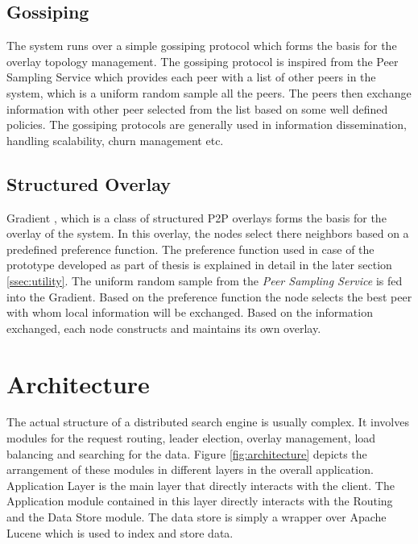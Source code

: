\documentclass[12pt,a4paper,twoside,openright]{book}
\begin{document}
\subsection{Gossiping}
The system runs over a simple gossiping protocol which forms the basis for the overlay topology management. The gossiping protocol is inspired from the Peer Sampling Service \cite{samplingService} which provides each peer with a list of other peers in the system,  which is a uniform random sample all the peers. The peers then exchange information with other peer selected from the list based on some well defined policies. The gossiping protocols are generally used in information dissemination, handling scalability, churn management etc.


\subsection{Structured Overlay}

Gradient \cite{sacha2006discovery}, which is a class of structured P2P overlays forms the basis for the overlay of the system. In this overlay, the nodes select there neighbors based on a predefined preference function. The preference function used in case of the prototype developed as part of thesis is explained in detail in the later section \ref{ssec:utility}. The uniform random sample from the \textit{Peer Sampling Service} is fed into the Gradient. Based on the preference function the node selects the best peer with whom local information will be exchanged. Based on the information exchanged, each node constructs and maintains its own overlay.


\section{Architecture}
\label{sec:architecture}

The actual structure of a distributed search engine is usually complex. It involves modules for the request routing, leader election, overlay management, load balancing and searching for the data. Figure \ref{fig:architecture} depicts the arrangement of these modules in different layers in the overall application. Application Layer is the main layer that directly interacts with the client. The Application module contained in this layer directly interacts with the Routing and the Data Store module. The data store is simply a wrapper over Apache Lucene which is used to index and store data.
\end{document}
